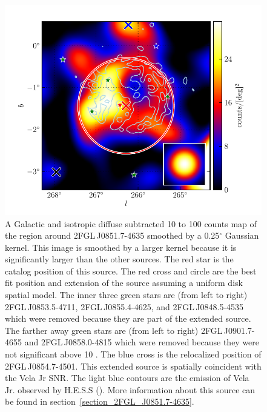 \documentclass[12pt,preprint]{aastex}
\newcommand{\gev}{\text{GeV}\xspace}
\newcommand{\tev}{\text{TeV}\xspace}
\renewcommand{\deg}{\ensuremath{^\circ}\xspace}
\begin{document}
\begin{figure}
  \begin{center}
    \includegraphics[type=pdf,ext=.pdf,read=.pdf]{source_plots/source_Vela_Jr}
  \end{center}
  \caption{A Galactic and isotropic diffuse subtracted 10 \gev to 100
  \gev counts map of the region around 2FGL\,J0851.7-4635 smoothed
  by a 0.25\deg Gaussian kernel. This image is smoothed by a larger
  kernel because it is significantly larger than the other sources.
  The red star is the catalog position of this source.  The red cross
  and circle are the best fit position and extension of the source
  assuming a uniform disk spatial model.  The inner three green stars
  are (from left to right) 2FGL\,J0853.5-4711, 2FGL\,J0855.4-4625,
  and 2FGL\,J0848.5-4535 which were removed because they are part of
  the extended source.  The farther away green stars are (from left to
  right) 2FGL\,J0901.7-4655 and 2FGL\,J0858.0-4815 which were removed
  because they were not significant above 10 \gev.  The blue cross
  is the relocalized position of 2FGL\,J0854.7-4501.  This extended
  source is spatially coincident with the Vela Jr SNR.  The light
  blue contours are the \tev emission of Vela Jr. observed by H.E.S.S
  (\cite{vela_jr_hess}).  More information about this source can be
  found in section~\ref{section_2FGL_J0851.7-4635}.
  }\label{Vela_Jr}
\end{figure}
\end{document}
